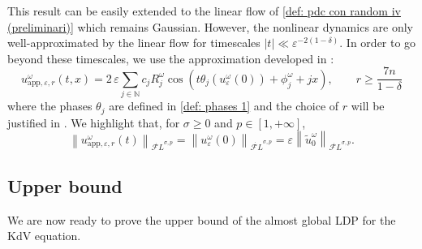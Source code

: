 \documentclass[a4paper,10pt,reqno]{article}
\theoremstyle{definition}
\theoremstyle{plain}
\theoremstyle{plain}
\theoremstyle{definition}
\theoremstyle{plain}
\theoremstyle{plain}
\theoremstyle{plain}
\theoremstyle{definition}
\theoremstyle{definition}
\newcommand{\norm}[1]{\left\lVert #1 \right\rVert}
\def \N{\mathbb N}
\def \FL{\mathcal{F}L}
\begin{document}
This result can be easily extended to the linear flow of \eqref{def: pdc con random iv (preliminari)} which remains Gaussian. However, the nonlinear dynamics are only well-approximated by the linear flow for timescales $|t|\ll \varepsilon^{-2(1-\delta)}$. In order to go beyond these timescales, we use the approximation developed in :
\begin{equation}\label{eq: random approximate solution}
u_{\mathrm{app},\varepsilon,r}^{\omega}(t,x) = 2 \, \varepsilon \sum_{j \in \N} c_j R_j^{\omega} \cos\left( t \theta_j(u_{\varepsilon}^{\omega}(0)) + \phi_j^{\omega} + jx\right), \qquad r \ge \frac{7n}{1-\delta}
\end{equation}
where the phases $\theta_j$ are defined in \eqref{def: phases 1} and the choice of $r$ will be justified in .
We highlight that, for $\sigma \ge 0$ and $p \in [1,+\infty]$,
\begin{equation}\label{eq:conserved_app_norm}
\norm{u_{\mathrm{app},\varepsilon,r}^{\omega}(t)}_{\dot{\FL}^{\sigma ,p}} = \norm{u_{\varepsilon}^{\omega}(0)}_{\dot{\FL}^{\sigma ,p}} = \varepsilon \norm{\widetilde{u}_0^{\omega}}_{\dot{\FL}^{\sigma,p}}.
\end{equation}

\subsection{Upper bound} \label{subsection: upper bound}

We are now ready to prove the upper bound of the almost global LDP for the KdV equation.
\end{document}
